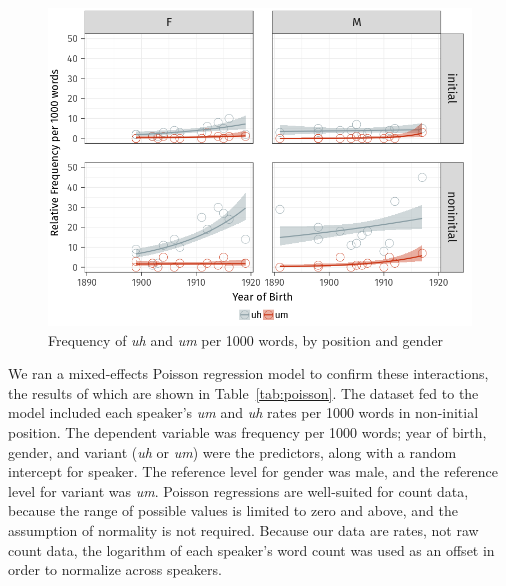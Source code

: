 \documentclass[11pt]{article}
\begin{document}
\begin{figure}[htpb]
    \centering
    \includegraphics[width=0.8\linewidth]{figures/relfreqgenderposition.png}
    \caption{Frequency of \emph{uh} and \emph{um} per 1000 words, by position
    and gender}%
    \label{fig:relfreqgenderposition}
\end{figure}

We ran a mixed-effects Poisson regression model to confirm these interactions,
the results of which are shown in Table~\ref{tab:poisson}.
The dataset fed to the model included each speaker's \emph{um} and \emph{uh}
rates per 1000 words in non-initial position.
The dependent variable was frequency per 1000 words;
year of birth, gender, and variant (\emph{uh} or \emph{um}) were the predictors,
along with a random intercept for speaker.
The reference level for gender was male, and the reference level for variant
was \emph{um}.
Poisson regressions are well-suited for count data, because the range of
possible values is limited to zero and above, and the assumption of normality is
not required.
Because our data are rates, not raw count data, the logarithm of each speaker's
word count was used as an offset in order to normalize across speakers.
\end{document}
